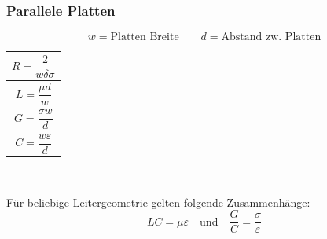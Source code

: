 \subsubsection{Parallele Platten}
{\small\[
        w  = \text{Platten Breite} \qquad d  = \text{Abstand zw. Platten}
    \]}


{\renewcommand*{\arraystretch}{0.2}
    \begin{tabularx}{0.5\columnwidth}{|X|}
        \hline
        \[R=\frac{2}{w\delta\sigma}\] \\
        \hline
        \[L=\frac{\mu d}{w}\]         \\
        \hline
        \[G=\frac{\sigma w}{d}\]      \\
        \hline
        \[C=\frac{w\varepsilon}{d}\]  \\
        \hline
    \end{tabularx}
}

\textbf{\color{red}{Leitungen gehen HIN und ZURÜCK!!!}\\
    \color{red}{Länge verdoppeln!!!}
}

\vspace{1ex}
Für beliebige Leitergeometrie gelten folgende Zusammenhänge:
\[
    LC = \mu\varepsilon \quad \text{und} \quad \frac{G}{C} = \frac{\sigma}{\varepsilon}
\]

